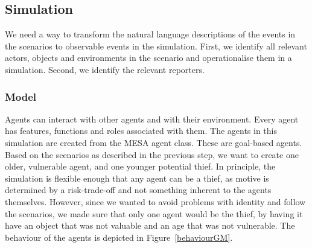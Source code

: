 \documentclass[12pt]{article}
\begin{document}


\subsection{Simulation}		%

We need a way to transform the natural language descriptions of the events in the scenarios to observable events in the simulation. First, we identify all relevant actors, objects and environments in the scenario and operationalise them in a simulation. Second, we identify the relevant reporters. 



\subsubsection{Model} 


Agents can interact with other agents and with their environment. Every agent has features, functions and roles associated with them. The agents in this simulation are created from the MESA agent class. These are goal-based agents.
Based on the scenarios as described in the previous step, we want to create one older, vulnerable agent, and one younger potential thief. In principle, the simulation is flexible enough that any agent can be a thief, as motive is determined by a risk-trade-off and not something inherent to the agents themselves. However, since we wanted to avoid problems with identity and follow the scenarios, we made sure that only one agent would be the thief, by having it have an object that was not valuable and an age that was not vulnerable. The behaviour of the agents is depicted in Figure~\ref{behaviourGM}.
\end{document}
